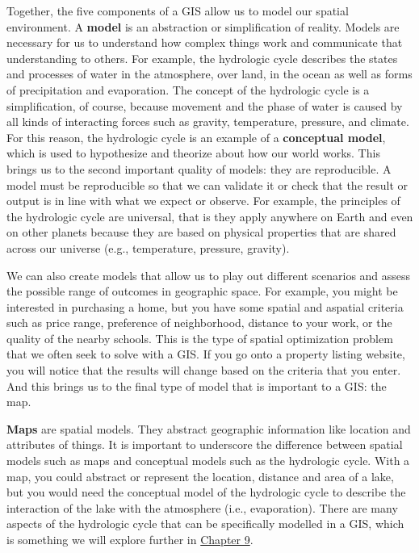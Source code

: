 \documentclass[
]{book}
\begin{document}
Together, the five components of a GIS allow us to model our spatial environment. A \textbf{model} is an abstraction or simplification of reality. Models are necessary for us to understand how complex things work and communicate that understanding to others. For example, the hydrologic cycle describes the states and processes of water in the atmosphere, over land, in the ocean as well as forms of precipitation and evaporation. The concept of the hydrologic cycle is a simplification, of course, because movement and the phase of water is caused by all kinds of interacting forces such as gravity, temperature, pressure, and climate. For this reason, the hydrologic cycle is an example of a \textbf{conceptual model}, which is used to hypothesize and theorize about how our world works. This brings us to the second important quality of models: they are reproducible. A model must be reproducible so that we can validate it or check that the result or output is in line with what we expect or observe. For example, the principles of the hydrologic cycle are universal, that is they apply anywhere on Earth and even on other planets because they are based on physical properties that are shared across our universe (e.g., temperature, pressure, gravity).

We can also create models that allow us to play out different scenarios and assess the possible range of outcomes in geographic space. For example, you might be interested in purchasing a home, but you have some spatial and aspatial criteria such as price range, preference of neighborhood, distance to your work, or the quality of the nearby schools. This is the type of spatial optimization problem that we often seek to solve with a GIS. If you go onto a property listing website, you will notice that the results will change based on the criteria that you enter. And this brings us to the final type of model that is important to a GIS: the map.

\textbf{Maps} are spatial models. They abstract geographic information like location and attributes of things. It is important to underscore the difference between spatial models such as maps and conceptual models such as the hydrologic cycle. With a map, you could abstract or represent the location, distance and area of a lake, but you would need the conceptual model of the hydrologic cycle to describe the interaction of the lake with the atmosphere (i.e., evaporation). There are many aspects of the hydrologic cycle that can be specifically modelled in a GIS, which is something we will explore further in \href{./raster-analysis-and-terrain-modelling.html}{Chapter 9}.
\end{document}

